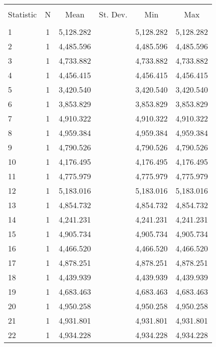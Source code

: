 
\begin{table}[!htbp] \centering 
  \caption{} 
  \label{} 
\begin{tabular}{@{\extracolsep{5pt}}lccccc} 
\\[-1.8ex]\hline 
\hline \\[-1.8ex] 
Statistic & \multicolumn{1}{c}{N} & \multicolumn{1}{c}{Mean} & \multicolumn{1}{c}{St. Dev.} & \multicolumn{1}{c}{Min} & \multicolumn{1}{c}{Max} \\ 
\hline \\[-1.8ex] 
1 & 1 & 5,128.282 &  & 5,128.282 & 5,128.282 \\ 
2 & 1 & 4,485.596 &  & 4,485.596 & 4,485.596 \\ 
3 & 1 & 4,733.882 &  & 4,733.882 & 4,733.882 \\ 
4 & 1 & 4,456.415 &  & 4,456.415 & 4,456.415 \\ 
5 & 1 & 3,420.540 &  & 3,420.540 & 3,420.540 \\ 
6 & 1 & 3,853.829 &  & 3,853.829 & 3,853.829 \\ 
7 & 1 & 4,910.322 &  & 4,910.322 & 4,910.322 \\ 
8 & 1 & 4,959.384 &  & 4,959.384 & 4,959.384 \\ 
9 & 1 & 4,790.526 &  & 4,790.526 & 4,790.526 \\ 
10 & 1 & 4,176.495 &  & 4,176.495 & 4,176.495 \\ 
11 & 1 & 4,775.979 &  & 4,775.979 & 4,775.979 \\ 
12 & 1 & 5,183.016 &  & 5,183.016 & 5,183.016 \\ 
13 & 1 & 4,854.732 &  & 4,854.732 & 4,854.732 \\ 
14 & 1 & 4,241.231 &  & 4,241.231 & 4,241.231 \\ 
15 & 1 & 4,905.734 &  & 4,905.734 & 4,905.734 \\ 
16 & 1 & 4,466.520 &  & 4,466.520 & 4,466.520 \\ 
17 & 1 & 4,878.251 &  & 4,878.251 & 4,878.251 \\ 
18 & 1 & 4,439.939 &  & 4,439.939 & 4,439.939 \\ 
19 & 1 & 4,683.463 &  & 4,683.463 & 4,683.463 \\ 
20 & 1 & 4,950.258 &  & 4,950.258 & 4,950.258 \\ 
21 & 1 & 4,931.801 &  & 4,931.801 & 4,931.801 \\ 
22 & 1 & 4,934.228 &  & 4,934.228 & 4,934.228 \\ 

\end{tabular}
\end{table}

